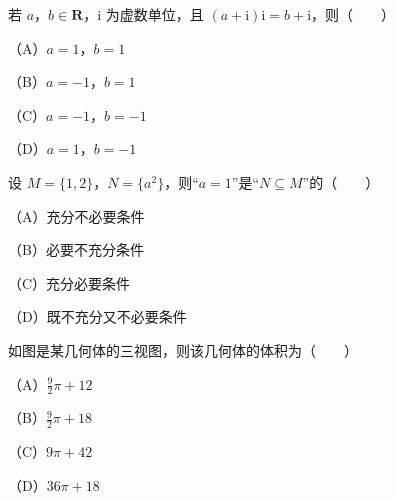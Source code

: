 

\begin{question}
若 $a$，$b\in\mathbf R$，$\mathrm i$ 为虚数单位，且 $(a+\mathrm i)\mathrm i=b+\mathrm i$，则\mbox{（　　）}

（A）$a=1$，$b=1$

（B）$a=-1$，$b=1$

（C）$a=-1$，$b=-1$

（D）$a=1$，$b=-1$

\end{question}
\begin{question}
设 $M=\{1,2\}$，$N=\{a^2\}$，则“$a=1$”是“$N\subseteq M$”的\mbox{（　　）}

（A）充分不必要条件

（B）必要不充分条件

（C）充分必要条件

（D）既不充分又不必要条件

\Needspace{0.4\textheight}
\end{question}
\begin{question}
如图是某几何体的三视图，则该几何体的体积为\mbox{（　　）}

（A）$\frac92\pi+12$

（B）$\frac92\pi+18$

（C）$9\pi+42$

（D）$36\pi+18$
\nopagebreak[4]
\begin{center}\end{center}
\nopagebreak[4]
\end{question}

